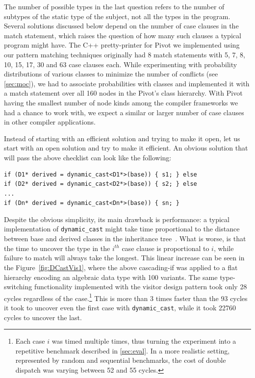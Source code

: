 \documentclass[preprint]{sigplanconf}
\makeatletter
\DeclareRobustCommand{\code}[1]{{\lstinline[breaklines=false,escapechar=@]{#1}}}
\makeatother
\begin{document}
The number of possible types in the last question refers to the number of subtypes 
of the static type of the subject, not all the types in the program. Several 
solutions discussed below depend on the number of case clauses in the match 
statement, which raises the question of how many such clauses a typical program 
might have. The C++ pretty-printer for Pivot we implemented using our pattern 
matching techniques originally had 8 match statements with 5, 7, 8, 10, 15, 17, 30 
and 63 case clauses each. While experimenting 
with probability distributions of various classes to minimize the number of 
conflicts (see \textsection\ref{sec:moc}), we had to associate probabilities 
with classes and implemented it with a match statement over all 160 nodes in the 
Pivot's class hierarchy. With Pivot having the smallest number of node kinds 
among the compiler frameworks we had a chance to work with, we expect a similar 
or larger number of case clauses in other compiler applications.

Instead of starting with an efficient solution and trying to make it open, let us 
start with an open solution and try to make it efficient. 
An obvious solution that will pass the above checklist can look like the following:

\begin{lstlisting}
if (D1* derived = dynamic_cast<D1*>(base)) { s1; } else
if (D2* derived = dynamic_cast<D2*>(base)) { s2; } else
...
if (Dn* derived = dynamic_cast<Dn*>(base)) { sn; }
\end{lstlisting}

\noindent
Despite the obvious simplicity, its main drawback is performance: a typical 
implementation of \code{dynamic_cast} might take time proportional to the 
distance between base and derived classes in the inheritance tree~\cite{XXXXX}.
What is worse, is that the time to uncover the type in the $i^{th}$ case clause 
is proportional to $i$, while failure to match will always take the longest. 
This linear increase can be seen in the Figure~\ref{fig:DCastVis1}, where 
the above cascading-if was applied to a flat hierarchy encoding an algebraic 
data type with 100 variants. The same type-switching functionality implemented 
with the visitor design pattern took only 28 cycles regardless of the 
case.\footnote{Each case $i$ was timed multiple times, thus turning the experiment 
into a repetitive benchmark described in \textsection\ref{sec:eval}. In a more
realistic setting, represented by random and sequential benchmarks, the cost of 
double dispatch was varying between 52 and 55 cycles.}
This is more than 3 times faster than the 93 cycles it took to uncover even the 
first case with \code{dynamic_cast}, while it took 22760 cycles to uncover the 
last.
\end{document}
